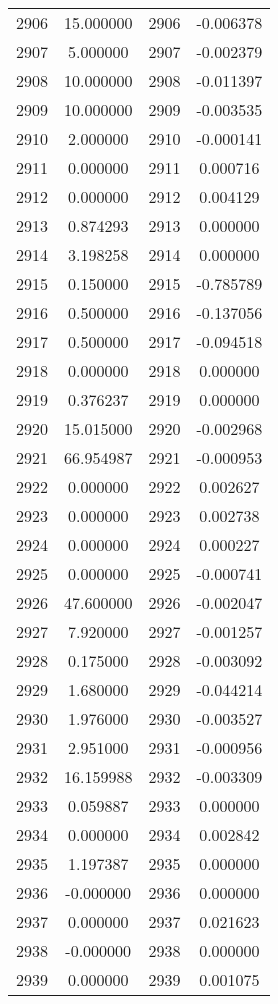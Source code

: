 \documentclass[12pt]{article}
\begin{document}
\begin{longtable}{@{}cccc@{}}
2906 & 15.000000 & 2906 & -0.006378 \\
2907 & 5.000000 & 2907 & -0.002379 \\
2908 & 10.000000 & 2908 & -0.011397 \\
2909 & 10.000000 & 2909 & -0.003535 \\
2910 & 2.000000 & 2910 & -0.000141 \\
2911 & 0.000000 & 2911 & 0.000716 \\
2912 & 0.000000 & 2912 & 0.004129 \\
2913 & 0.874293 & 2913 & 0.000000 \\
2914 & 3.198258 & 2914 & 0.000000 \\
2915 & 0.150000 & 2915 & -0.785789 \\
2916 & 0.500000 & 2916 & -0.137056 \\
2917 & 0.500000 & 2917 & -0.094518 \\
2918 & 0.000000 & 2918 & 0.000000 \\
2919 & 0.376237 & 2919 & 0.000000 \\
2920 & 15.015000 & 2920 & -0.002968 \\
2921 & 66.954987 & 2921 & -0.000953 \\
2922 & 0.000000 & 2922 & 0.002627 \\
2923 & 0.000000 & 2923 & 0.002738 \\
2924 & 0.000000 & 2924 & 0.000227 \\
2925 & 0.000000 & 2925 & -0.000741 \\
2926 & 47.600000 & 2926 & -0.002047 \\
2927 & 7.920000 & 2927 & -0.001257 \\
2928 & 0.175000 & 2928 & -0.003092 \\
2929 & 1.680000 & 2929 & -0.044214 \\
2930 & 1.976000 & 2930 & -0.003527 \\
2931 & 2.951000 & 2931 & -0.000956 \\
2932 & 16.159988 & 2932 & -0.003309 \\
2933 & 0.059887 & 2933 & 0.000000 \\
2934 & 0.000000 & 2934 & 0.002842 \\
2935 & 1.197387 & 2935 & 0.000000 \\
2936 & -0.000000 & 2936 & 0.000000 \\
2937 & 0.000000 & 2937 & 0.021623 \\
2938 & -0.000000 & 2938 & 0.000000 \\
2939 & 0.000000 & 2939 & 0.001075 \\

\end{longtable}
\end{document}
